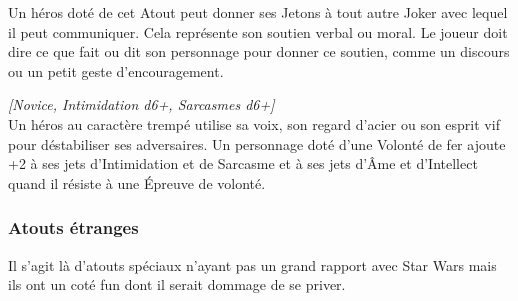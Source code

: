 \begin{description}[align=left]
        Un héros doté de cet Atout peut donner ses Jetons à tout autre Joker avec lequel il peut communiquer. Cela représente son soutien verbal ou moral. Le joueur doit dire ce que fait ou dit son personnage pour donner ce soutien, comme un discours ou un petit geste d’encouragement.

    \item [Volonté de Fer]
        \emph{[Novice, Intimidation d6+, Sarcasmes d6+]}\\
        Un héros au caractère trempé utilise sa voix, son regard d’acier ou son esprit vif pour déstabiliser ses adversaires. Un personnage doté d’une Volonté de fer ajoute +2 à ses jets d’Intimidation et de Sarcasme et à ses jets d’\^Ame et d’Intellect quand il résiste à une Épreuve de volonté.
\end{description}

\newpage
\subsubsection{Atouts étranges}

Il s’agit là d’atouts spéciaux n’ayant pas un grand rapport avec Star Wars mais ils ont un coté fun dont il serait dommage de se priver.

